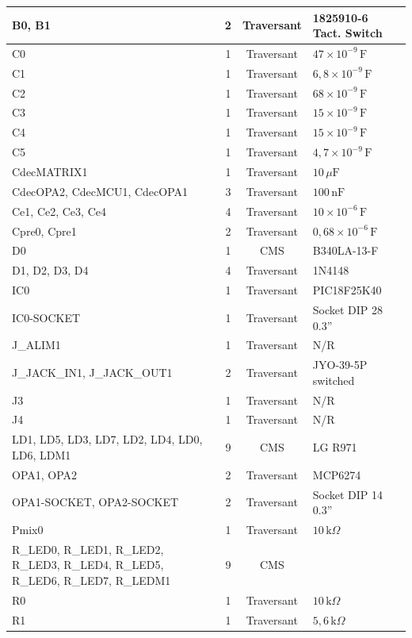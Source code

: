 \documentclass{report}
\begin{document}
\begin{longtable}{|p{5cm}|c|c|p{5cm}|}
B0, B1 & 2 & Traversant & 1825910-6 Tact. Switch \\
\hline
C0 & 1 & Traversant & \(47 \times 10^{-9}\,\mathrm{F}\) \\
\hline
C1 & 1 & Traversant & \(6{,}8 \times 10^{-9}\,\mathrm{F}\) \\
\hline
C2 & 1 & Traversant & \(68 \times 10^{-9}\,\mathrm{F}\) \\
\hline
C3 & 1 & Traversant & \(15 \times 10^{-9}\,\mathrm{F}\) \\
\hline
C4 & 1 & Traversant & \(15 \times 10^{-9}\,\mathrm{F}\) \\
\hline
C5 & 1 & Traversant & \(4{,}7 \times 10^{-9}\,\mathrm{F}\) \\
\hline
CdecMATRIX1 & 1 & Traversant & \(10\,\mu\mathrm{F}\) \\
\hline
CdecOPA2, CdecMCU1, CdecOPA1 & 3 & Traversant & \(100\,\mathrm{nF}\) \\
\hline
Ce1, Ce2, Ce3, Ce4 & 4 & Traversant & \(10 \times 10^{-6}\,\mathrm{F}\) \\
\hline
Cpre0, Cpre1 & 2 & Traversant & \(0{,}68 \times 10^{-6}\,\mathrm{F}\) \\
\hline
D0 & 1 & CMS & B340LA-13-F \\
\hline
D1, D2, D3, D4 & 4 & Traversant & 1N4148 \\
\hline
IC0 & 1 & Traversant & PIC18F25K40 \\
\hline
IC0-SOCKET & 1 & Traversant & Socket DIP 28 0.3'' \\
\hline
J\_ALIM1 & 1 & Traversant & N/R \\
\hline
J\_JACK\_IN1, J\_JACK\_OUT1 & 2 & Traversant & JYO-39-5P switched \\
\hline
J3 & 1 & Traversant & N/R \\
\hline
J4 & 1 & Traversant & N/R \\
\hline
LD1, LD5, LD3, LD7, LD2, LD4, LD0, LD6, LDM1 & 9 & CMS & LG R971 \\
\hline
OPA1, OPA2 & 2 & Traversant & MCP6274 \\
\hline
OPA1-SOCKET, OPA2-SOCKET & 2 & Traversant & Socket DIP 14 0.3'' \\
\hline
Pmix0 & 1 & Traversant & \(10\,\mathrm{k}\Omega\) \\
\hline
R\_LED0, R\_LED1, R\_LED2, R\_LED3, R\_LED4, R\_LED5, R\_LED6, R\_LED7, R\_LEDM1 & 9 & CMS & \\
\hline
R0 & 1 & Traversant & \(10\,\mathrm{k}\Omega\) \\
\hline
R1 & 1 & Traversant & \(5{,}6\,\mathrm{k}\Omega\) \\

\end{longtable}
\end{document}

